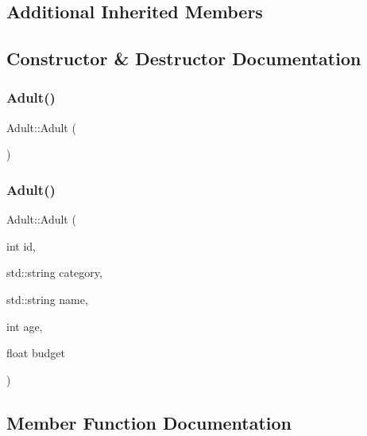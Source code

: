 \subsection*{Additional Inherited Members}


\subsection{Constructor \& Destructor Documentation}
\mbox{\label{class_adult_a0c614efdb50b7bce512eb0ca3ef87208}} 
\subsubsection{\texorpdfstring{Adult()}{Adult()}\hspace{0.1cm}{\footnotesize\ttfamily [1/2]}}
{\footnotesize\ttfamily Adult\+::\+Adult (\begin{DoxyParamCaption}{ }\end{DoxyParamCaption})}

\mbox{\label{class_adult_a327db6418fe4038c1d160e61c6e57d42}} 
\subsubsection{\texorpdfstring{Adult()}{Adult()}\hspace{0.1cm}{\footnotesize\ttfamily [2/2]}}
{\footnotesize\ttfamily Adult\+::\+Adult (\begin{DoxyParamCaption}\item[{int}]{id,  }\item[{std\+::string}]{category,  }\item[{std\+::string}]{name,  }\item[{int}]{age,  }\item[{float}]{budget }\end{DoxyParamCaption})}



\subsection{Member Function Documentation}
\mbox{\label{class_adult_a4fda91eca49bcc0c60d7d60db0e35ba4}} 
